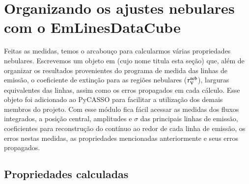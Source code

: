 

\chapter{Organizando os ajustes nebulares com o EmLinesDataCube}
\label{apendice:EmLinesDataCube}

Feitas as medidas, temos o arcabouço para calcularmos várias propriedades nebulares. Escrevemos um objeto em \pyt (cujo nome titula esta seção) que, além de organizar os resultados provenientes do programa de medida das linhas de emissão, o coeficiente de extinção para as regiões nebulares ($\tau_{\mathrm{V}}^{\mathrm{neb}}$), larguras equivalentes das linhas, assim como os erros propagados em cada cálculo. Esse objeto foi adicionado ao PyCASSO para facilitar a utilização dos demais membros do projeto. Com esse módulo fica fácil acessar as medidas dos fluxos integrados, a posição central, amplitudes e $\sigma$ das principais linhas de emissão, coeficientes para reconstrução do contínuo ao redor de cada linha de emissão, os erros nestas medidas, as propriedades mencionadas anteriormente e seus erros propagados.


\section{Propriedades calculadas}
\label{apendice:EmLinesDataCube:props}

